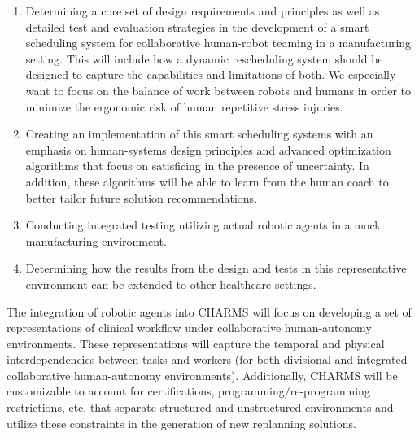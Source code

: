 \begin{enumerate}
    \item Determining a core set of design requirements and principles as well as detailed test and evaluation strategies in the development of a smart scheduling system for collaborative human-robot teaming in a manufacturing setting. This will include how a dynamic rescheduling system should be designed to capture the capabilities and limitations of both. We especially want to focus on the balance of work between robots and humans in order to minimize the ergonomic risk of human repetitive stress injuries.
    \item Creating an implementation of this smart scheduling systems with an emphasis on human-systems design principles and advanced optimization algorithms that focus on satisficing in the presence of uncertainty. In addition, these algorithms will be able to learn from the human coach to better tailor future solution recommendations.
    \item Conducting integrated testing utilizing actual robotic agents in a mock manufacturing environment.
    \item	Determining how the results from the design and tests in this representative environment can be extended to other healthcare settings. 
\end{enumerate}

The integration of robotic agents into CHARMS will focus on developing a set of representations of clinical workflow under collaborative human-autonomy environments. These representations will capture the temporal and physical interdependencies between tasks and workers (for both divisional and integrated collaborative human-autonomy environments). Additionally, CHARMS will be customizable to account for certifications, programming/re-programming restrictions, etc. that separate structured and unstructured environments and utilize these constraints in the generation of new replanning solutions.

